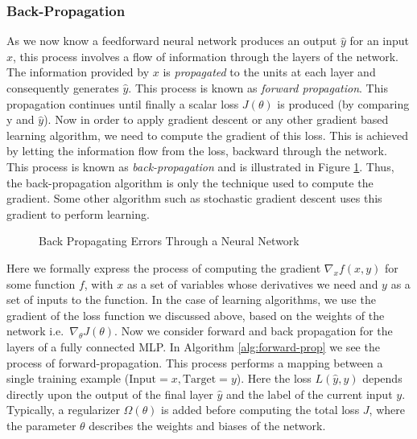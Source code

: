 \documentclass[14pt]{extarticle}
\numberwithin{equation}{section}
\begin{document}
	\subsubsection{Back-Propagation}	
	As we now know a feedforward neural network produces an output $\hat{y}$ for an input $x$, this process involves a flow of information through the layers of the network. The information provided by $x$ is \textit{propagated} to the units at each layer and consequently generates $\hat{y}$. This process is known as \textit{forward propagation}. This propagation continues until finally a scalar loss $J(\theta)$ is produced (by comparing y and $ \hat{y}$). Now in order to apply gradient descent or any other gradient based learning algorithm, we need to compute the gradient of this loss. This is achieved by letting the information flow from the loss, backward through the network. This process is known as \textit{back-propagation}\cite{rumelhart1986learning} and is illustrated in Figure \ref{back_prop}. Thus, the back-propagation algorithm is only the technique used to compute the gradient. Some other algorithm such as stochastic gradient descent uses this gradient to perform learning. 
	\begin{figure}[H]
		\centering
		\setlength{\fboxsep}{5pt}%
		\setlength{\fboxrule}{1pt}%
		\caption{Back Propagating Errors Through a Neural Network
			\label{back_prop}}
	\end{figure}
	Here we formally express the process of computing the gradient $\nabla_{x}f(x,y)$ for some function $f$, with $x$ as a set of variables whose derivatives we need and $y$ as a set of inputs to the function. In the case of learning algorithms, we use the gradient of the loss function we discussed above, based on the weights of the network i.e.\ $\nabla_{\theta}J(\theta)$.
Now we consider forward and back propagation for the layers of a fully connected MLP. In Algorithm \ref{alg:forward-prop} we see the process of forward-propagation. This process performs a mapping between a single training example ($\text{Input}=x, \text{Target}=y$). Here the loss $L(\hat{y},y)$ depends directly upon the output of the final layer $\hat{y}$ and the label of the current input $y$. Typically, a regularizer $\Omega(\theta)$ is added before computing the total loss $J$, where the parameter $\theta$ describes the weights and biases of the network.
\end{document}
